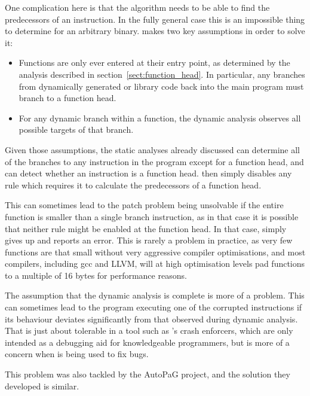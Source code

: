 One complication here is that the algorithm needs to be able to find
the predecessors of an instruction.  In the fully general case this is
an impossible thing to determine for an arbitrary binary.
{\Technique} makes two key assumptions in order to solve it:

\begin{itemize}
\item
  Functions are only ever entered at their entry point, as determined
  by the analysis described in section~\ref{sect:function_head}.  In
  particular, any branches from dynamically generated or library code
  back into the main program must branch to a function head.
\item
  For any dynamic branch within a function, the dynamic analysis
  observes all possible targets of that branch.
\end{itemize}

Given those assumptions, the static analyses already discussed can
determine all of the branches to any instruction in the program except
for a function head, and can detect whether an instruction is a
function head.  {\Technique} then simply disables any rule which
requires it to calculate the predecessors of a function head.

This can sometimes lead to the patch problem being unsolvable if the
entire function is smaller than a single branch instruction, as in
that case it is possible that neither rule might be enabled at the
function head.  In that case, {\implementation} simply gives up and
reports an error.  This is rarely a problem in practice, as very few
functions are that small without very aggressive compiler
optimisations, and most compilers, including gcc and LLVM\needCite{},
will at high optimisation levels pad functions to a multiple of 16
bytes for performance reasons.

The assumption that the dynamic analysis is complete is more of a
problem.  This can sometimes lead to the program executing one of the
corrupted instructions if its behaviour deviates significantly from
that observed during dynamic analysis.  That is just about tolerable
in a tool such as {\technique}'s crash enforcers, which are only
intended as a debugging aid for knowledgeable programmers, but is more
of a concern when {\technique} is being used to fix bugs. 

This problem was also tackled by the AutoPaG project, and the solution
they developed is similar. 

